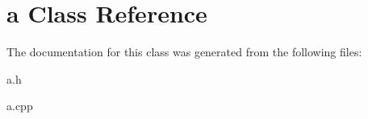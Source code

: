\hypertarget{classa}{}\section{a Class Reference}
\label{classa}


The documentation for this class was generated from the following files\+:\begin{DoxyCompactItemize}
\item 
a.\+h\item 
a.\+cpp\end{DoxyCompactItemize}
